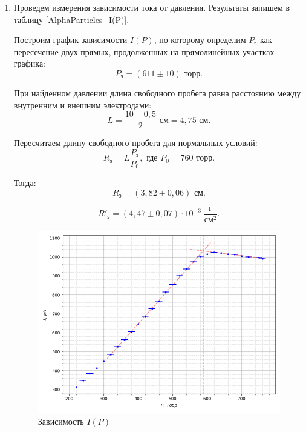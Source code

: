 \documentclass{article}
\begin{document}
	
	\begin{enumerate}
		\item Проведем измерения зависимости тока от давления. Результаты запишем в таблицу \ref{AlphaParticles_I(P)}.
	


	
	
		Построим график зависимости $I(P)$, по которому определим $P_\text{э}$ как пересечение двух прямых, продолженных на прямолинейных участках графика:
		\begin{equation*}
			P_\text{э} = (611 \pm 10) \text{ торр}.
		\end{equation*}
	
		При найденном давлении длина свободного пробега равна расстоянию между внутренним и внешним электродами:
		\begin{equation*}
			L = \frac{10-0,5}{2} \text{ см} = 4,75 \text{ см}.
		\end{equation*}
	
		Пересчитаем длину свободного пробега для нормальных условий:
		\begin{equation*}
			R_\text{э} = L\frac{P_\text{э}}{P_0}, \text{ где } P_0 = 760 \text{ торр}.
		\end{equation*}
		
		Тогда:
		\begin{equation*}
			R_\text{э} = (3,82 \pm 0,06) \text{ см}.
		\end{equation*}	
	
		\begin{equation*}
			R'_\text{э} = (4,47 \pm 0,07) \cdot 10^{-3} \;\dfrac{\text{г}}{\text{см}^2}.
		\end{equation*}		
	
		
		\begin{figure}[h!]
			\centering
			\includegraphics[width=\linewidth]{5.4.1I(P).png}
			\caption{Зависимость $I(P)$}
		\end{figure}
	

\end{enumerate}
\end{document}
